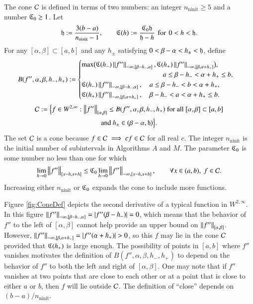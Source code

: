 \documentclass[review]{elsarticle}
\theoremstyle{definition}
\renewcommand{\cw}{W}
\newenvironment{FJHchange}{\color{blue}}{} %
\DeclareMathOperator{\ninit}{ninit}
\begin{document}
The cone $\cc$ is defined in terms of two numbers: an integer $n_{\ninit} \ge 5$
and a  number $\fC_0 \ge 1$. Let
\begin{equation}
\label{hCdef}
\fh := \frac{3(b-a)}{n_{\ninit}-1}, \qquad \fC(h) := \frac{\fC_0 \fh}{\fh - h}
\mbox{\, for \,} 0<h<\fh.
\end{equation}
For any $[\alpha, \beta] \subset [a,b]$ and any $h_{\pm}$ satisfying $0 <
\beta - \alpha < h_{\pm} < \fh$, define
\begin{equation} \label{tbdef}
B(f'',\alpha,\beta,h_-,h_+) :=
\begin{cases}
   \max\bigl(\fC(h_{-}) \norm[-\infty,{[\beta-h_-,\alpha]}]{f''},\fC(h_{+})
   \norm[-\infty,{[\beta, \alpha+h_+]}]{f''}\bigr),
\\                                             \hspace{26ex} a \le \beta- h_- <  \alpha + h_+ \le b,
\\ \fC(h_{-}) \norm[-\infty,{[\beta-h_-,\alpha]}]{f''},  \quad a \le \beta- h_- < b< \alpha + h_+,
\\ \fC(h_{+}) \norm[-\infty,{[\beta, \alpha+h_+]}]{f''},
\quad \beta- h_- <  a  < \alpha + h_+ \le b.
\end{cases}
\end{equation}
\begin{multline} \label{conedef}
 \cc := \Bigl \{
 f  \in    \cw^{2,\infty}:   \norm[{[\alpha,\beta]}]{f''}  \le B(f'',\alpha,\beta,h_-,h_+)
 \text{ for all } [\alpha,\beta] \subset [a,b]
\\ \text{and } h_{\pm} \in (\beta - \alpha,  \fh)  \Bigr \}.
\end{multline}
The set $\cc$ is a cone because $f \in \cc \implies cf \in \cc$ for all real
$c$. The integer $n_{\ninit}$ is the initial number of subintervals in
Algorithms $A$ and $M$. \begin{FJHchange}The parameter $\fC_0$ is some number 
no less 
than one for 
which
\[
\lim_{h \to 0} \norm[{[x-h,x+h]}]{f''} \le 
\fC_0 \lim_{h \to 0} \norm[-\infty,{[x-h,x+h]}]{f''}, \qquad \forall x \in (a,b), \ f \in \cc.
\]\end{FJHchange}
Increasing either $n_{\ninit}$ or $\fC_0$ expands the cone to
include more functions.

Figure \ref{fig:ConeDef} depicts the second derivative of a typical function in
$\cw^{2,\infty}$.  In this figure
$\norm[-\infty,{[\beta-h_-,\alpha]}]{f''} = \abs{f''(\beta - h_-)} = 0$, which means that the
behavior of $f''$ to the left of $[\alpha,\beta]$ cannot help provide an upper bound on $
\norm[{[\alpha,\beta]}]{f''}$.  However, $\norm[-\infty,{[\beta,\alpha+h_+]}]{f''} =
\abs{f''(\alpha + h_+)} > 0$, so this $f$ may lie in the cone $\cc$ provided that
$\fC(h_+)$ is large enough.  The possibility of points in $[a,b]$ where $f''$ vanishes
motivates the definition of $B(f'',\alpha,\beta,h_-,h_+)$ to depend on the behavior of $f''$
to both the left and right of $[\alpha,\beta]$.  One may note that if $f''$ vanishes at two
points that are close to each other or at a point that is close to either $a$ or $b$, then
$f$ will lie outside $\cc$.  The definition of ``close'' depends on
$(b-a)/n_{\ninit}$.
\end{document}
